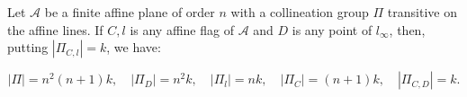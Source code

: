 Let $\mathcal{A}$ be a finite affine plane of order $n$ with a collineation group $\Pi$ transitive on the affine lines. If $C, l$ is any affine flag of $\mathcal{A}$ and $D$ is any point of $l_{\infty}$, then, putting $|\Pi_{C,l}| = k$, we have:

$$|\Pi| = n^2(n+1)k,\quad |\Pi_D| = n^2 k,\quad |\Pi_l| = n k,\quad |\Pi_C| = (n+1)k,\quad |\Pi_{C,D}| = k.$$
